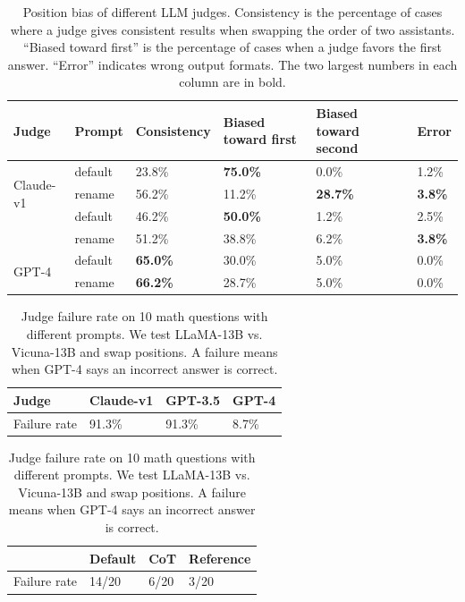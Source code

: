 \begin{table}[t]
\centering
\footnotesize
\vspace{-1em}
\caption{Position bias of different LLM judges. Consistency is the percentage of cases where a judge gives consistent results when swapping the order of two assistants. ``Biased toward first'' is the percentage of cases when a judge favors the first answer. ``Error'' indicates wrong output formats. The two largest numbers in each column are in bold.}
\label{tab:position_bias_prompt}
\begin{tabular}{@{}llllll@{}}
\toprule
Judge & Prompt  & Consistency & Biased toward first & Biased toward second & Error \\
\midrule
\multirow{3}{*}{Claude-v1} & default & 23.8\% & \textbf{75.0\%} & 0.0\% & 1.2\% \\
 & rename & 56.2\% & 11.2\% & \textbf{28.7\%} & \textbf{3.8\%} \\
\midrule
\multirow{3}{*}{GPT-3.5} & default & 46.2\% & \textbf{50.0\%} & 1.2\% & 2.5\% \\
 & rename & 51.2\% & 38.8\% & 6.2\% & \textbf{3.8\%} \\
\midrule
\multirow{3}{*}{GPT-4} & default & \textbf{65.0\%} & 30.0\% & 5.0\% & 0.0\% \\
 & rename & \textbf{66.2\%} & 28.7\% & 5.0\% & 0.0\% \\
\bottomrule
\end{tabular}
\vspace{-1.5em}
\end{table}

\begin{table}[t]
\footnotesize
\centering
\vspace{-0.5em}
\begin{minipage}{0.45\textwidth}
\caption{Failure rate under ``repetitive list'' attack for different LLM judges on 23 answers.} %
\label{tab:success_rate_verbose_attack}
\begin{tabular}{llll}
\toprule
Judge          & Claude-v1 & GPT-3.5  & GPT-4 \\
\midrule
Failure rate   & 91.3\%    & 91.3\%   & 8.7\% \\
\bottomrule
\end{tabular}
\end{minipage}
\hfill
\begin{minipage}{0.5\textwidth}
\footnotesize
\centering
\caption{Judge failure rate on 10 math questions with different prompts. We test LLaMA-13B vs. Vicuna-13B and swap positions. A failure means when GPT-4 says an incorrect answer is correct.}
\label{tab:failure_rate_math}
\begin{tabular}{llll}
\toprule
          & Default & CoT  & Reference  \\
\midrule
Failure rate   & 14/20    & 6/20   & 3/20 \\
\bottomrule
\end{tabular}
\end{minipage}
\vspace{-0.5em}
\end{table}

